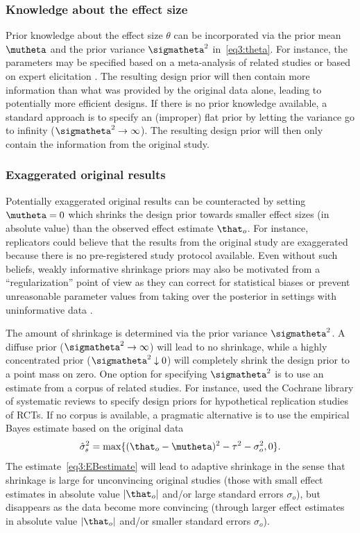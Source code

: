 \subsubsection{Knowledge about the effect size}
Prior knowledge about the effect size $\theta$ can be incorporated via the prior
mean $\mutheta$ and the prior variance $\sigmatheta^2$ in~\eqref{eq3:theta}. For
instance, the parameters may be specified based on a meta-analysis of related
studies \citep{McKinney2021} or based on expert elicitation \citep{OHagan2019}.
The resulting design prior will then contain more information than what was
provided by the original data alone, leading to potentially more efficient
designs. If there is no prior knowledge available, a standard approach is to
specify an (improper) flat prior by letting the variance go to infinity
($\sigmatheta^2 \to \infty$). The resulting design prior will then only contain
the information from the original study.

\subsubsection{Exaggerated original results}
\label{sec3:shrinkage}
Potentially exaggerated original results can be counteracted by setting
$\mutheta = 0$ which shrinks the design prior towards smaller effect sizes (in
absolute value) than the observed effect estimate $\that_{o}$. For instance,
replicators could believe that the results from the original study are
exaggerated because there is no pre-registered study protocol available. Even
without such beliefs, weakly informative shrinkage priors may also be motivated
from a ``regularization'' point of view as they can correct for statistical
biases \citep{Copas1983, Firth1993} or prevent unreasonable parameter values
from taking over the posterior in settings with uninformative data
\citep{Gelman2009}.

The amount of shrinkage is determined via the prior variance $\sigmatheta^2$. A
diffuse prior ($\sigmatheta^2 \to \infty$) will lead to no shrinkage, while a
highly concentrated prior ($\sigmatheta^2 \downarrow 0$) will completely shrink
the design prior to a point mass on zero. One option for specifying
$\sigmatheta^2$ is to use an estimate from a corpus of related studies. For
instance, \citet{vanZwet2021} used the Cochrane library of systematic reviews to
specify design priors for hypothetical replication studies of RCTs. If no corpus
is available, a pragmatic alternative is to use the empirical Bayes estimate
based on the original data
\begin{align}
  \label{eq3:EBestimate}
  \hat{\sigma}^2_{\scriptscriptstyle{\theta}} = \max\{(\that_{o} - \mutheta)^{2} - \tau^{2} - \sigma^{2}_{o}, 0\}.
\end{align}
The estimate~\eqref{eq3:EBestimate} will lead to adaptive shrinkage
\citep{Pawel2020} in the sense that shrinkage is large for unconvincing original
studies (those with small effect estimates in absolute value $|\that_{o}|$
and/or large standard errors $\sigma_{o}$), but disappears as the data become
more convincing (through larger effect estimates in absolute value $|\that_{o}|$
and/or smaller standard errors $\sigma_{o}$).




